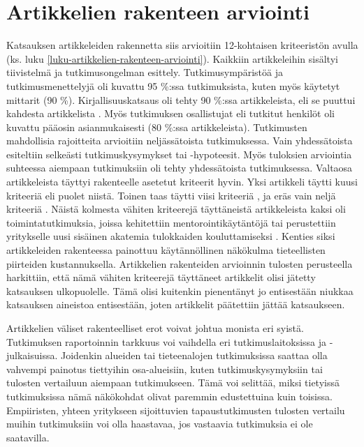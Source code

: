 \documentclass[utf8]{gradu3}
\begin{document}
\section{Artikkelien rakenteen arviointi}
\label{luku-pohdinta-artikkelien-rakenteen-arviointi}

Katsauksen artikkeleiden rakennetta siis arvioitiin 12-kohtaisen kriteeristön avulla (ks. luku \ref{luku-artikkelien-rakenteen-arviointi}). Kaikkiin artikkeleihin sisältyi tiivistelmä ja tutkimusongelman esittely. Tutkimusympäristöä ja tutkimusmenettelyjä oli kuvattu 95 \%:ssa tutkimuksista, kuten myös käytetyt mittarit (90 \%). Kirjallisuuskatsaus oli tehty 90 \%:ssa artikkeleista, eli se puuttui kahdesta artikkelista %
\parencites%
    {shannon-pool-2016}%
    {kulkarni-ym-2010}%
\relax.
%
Myös tutkimuksen osallistujat eli tutkitut henkilöt oli kuvattu pääosin asianmukaisesti (80 \%:ssa artikkeleista). Tutkimusten mahdollisia rajoitteita arvioitiin neljässätoista tutkimuksessa. Vain yhdessätoista esiteltiin selkeästi tutkimuskysymykset tai -hypoteesit. Myös tuloksien arviointia suhteessa aiempaan tutkimuksiin oli tehty yhdessätoista tutkimuksessa. Valtaosa artikkeleista täyttyi rakenteelle asetetut kriteerit hyvin. Yksi artikkeli \parencite{shannon-pool-2016} täytti kuusi kriteeriä eli puolet niistä. Toinen taas täytti viisi kriteeriä \parencite{kumar-ym-2016}, ja eräs vain neljä kriteeriä \parencite{bjornson-dingsøyr-2005}. Näistä kolmesta vähiten kriteerejä täyttäneistä artikkeleista kaksi oli toimintatutkimuksia, joissa kehitettiin mentorointikäytäntöjä \parencite{bjornson-dingsøyr-2005} tai perustettiin yritykselle uusi sisäinen akatemia tulokkaiden kouluttamiseksi \parencite{shannon-pool-2016}. Kenties siksi artikkeleiden rakenteessa painottuu käytännöllinen näkökulma tieteellisten piirteiden kustannuksella. Artikkelien rakenteiden arvioinnin tulosten perusteella harkittiin, että nämä vähiten kriteerejä täyttäneet artikkelit olisi jätetty katsauksen ulkopuolelle. Tämä olisi kuitenkin pienentänyt jo entisestään niukkaa katsauksen aineistoa entisestään, joten artikkelit päätettiin jättää katsaukseen.

Artikkelien väliset rakenteelliset erot voivat johtua monista eri syistä. Tutkimuksen raportoinnin tarkkuus voi vaihdella eri tutkimuslaitoksissa ja -julkaisuissa. Joidenkin alueiden tai tieteenalojen tutkimuksissa saattaa olla vahvempi painotus tiettyihin osa-alueisiin, kuten tutkimuskysymyksiin tai tulosten vertailuun aiempaan tutkimukseen. Tämä voi selittää, miksi tietyissä tutkimuksissa nämä näkökohdat olivat paremmin edustettuina kuin toisissa. Empiiristen, yhteen yritykseen sijoittuvien tapaustutkimusten tulosten vertailu muihin tutkimuksiin voi olla haastavaa, jos vastaavia tutkimuksia ei ole saatavilla.
\end{document}
